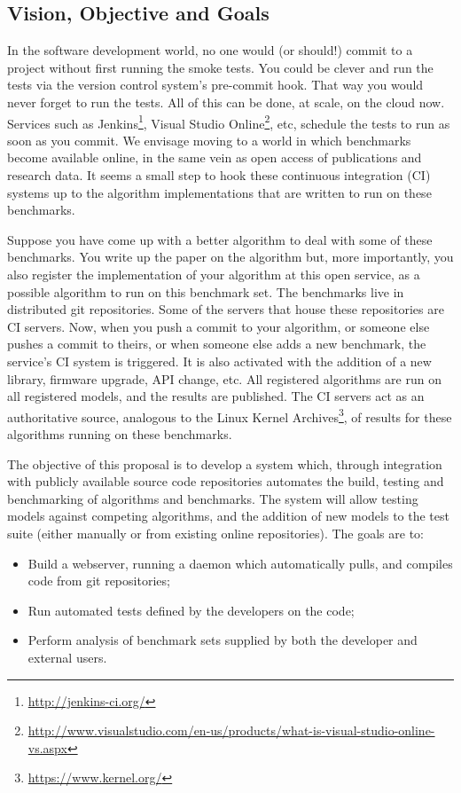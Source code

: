 \documentclass[a4paper,11pt]{article}
\begin{document}
\subsection*{Vision, Objective and Goals}

In the software development world, no one would (or should!) commit to
a project without first running the smoke tests. You could be clever
and run the tests via the version control system's pre-commit
hook. That way you would never forget to run the tests. All of this
can be done, at scale, on the cloud now. Services such as
Jenkins\footnote{\url{http://jenkins-ci.org/}}, Visual Studio
Online\footnote{\url{http://www.visualstudio.com/en-us/products/what-is-visual-studio-online-vs.aspx}},
etc, schedule the tests to run as soon as you commit. We envisage
moving to a world in which benchmarks become available online, in the
same vein as open access of publications and research data. It seems a
small step to hook these continuous integration (CI) systems up to the
algorithm implementations that are written to run on these benchmarks.

Suppose you have come up with a better algorithm to deal with some of
these benchmarks. You write up the paper on the algorithm but, more
importantly, you also register the implementation of your algorithm at
this open service, as a possible algorithm to run on this benchmark
set. The benchmarks live in distributed git 
repositories. Some of the servers that house these repositories are CI
servers. Now, when you push a commit to your algorithm, or someone
else pushes a commit to theirs, or when someone else adds a new
benchmark, the service's CI system is triggered. It is also activated
with the addition of a new library, firmware upgrade, API change,
etc. All registered algorithms are run on all registered models, and
the results are published. The CI servers act as an authoritative
source, analogous to the Linux Kernel
Archives\footnote{\url{https://www.kernel.org/}}, of results for these
algorithms running on these benchmarks.

The objective of this proposal is to develop a system which, through
integration with publicly available source code repositories automates
the build, testing and benchmarking of algorithms and benchmarks. The 
system will allow testing models against competing algorithms, and the
addition of new models to the test suite (either manually or from existing
online repositories). The goals are to:

\begin{itemize}
	\item Build a webserver, running a daemon which automatically pulls, and compiles
code from git repositories;
\item Run automated tests defined by the developers on the code;
\item Perform analysis of benchmark sets supplied by both the developer and external
users.
\end{itemize}
\end{document}
